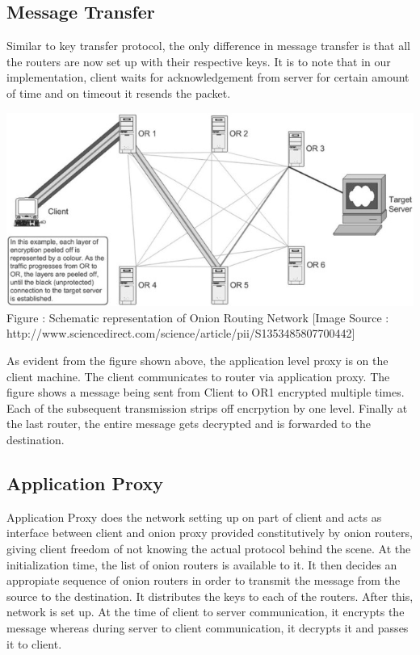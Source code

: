 \documentclass{article}
\begin{document}
\subsection*{Message Transfer}
Similar to key transfer protocol, the only difference in message transfer is that all the routers are now set up with their respective keys. It is to note that in our implementation, client waits for acknowledgement from server for certain amount of time and on timeout it resends the packet.
\newline
\newline
\begin{center}
\includegraphics{onion.jpg}
\newline
 \small{Figure : Schematic representation of Onion Routing Network}
 \newline
 \tiny{[Image Source : http://www.sciencedirect.com/science/article/pii/S1353485807700442]}
 \newline
\end{center}
As evident from the figure shown above, the application level proxy is on the client machine. The client communicates to router via application proxy. The figure shows a message being sent from Client to OR1 encrypted multiple times. Each of the subsequent transmission strips off encrpytion by one level. Finally at the last router, the entire message gets decrypted and is forwarded to the destination.
\subsection*{Application Proxy}
Application Proxy does the network setting up on part of client and acts as interface between client and onion proxy provided constitutively by onion routers, giving client freedom of not knowing the actual protocol behind the scene. At the initialization time, the list of onion routers is available to it. It then decides an appropiate sequence of onion routers in order to transmit the message from the source to the destination. It distributes the keys to each of the routers. After this, network is set up. At the time of client to server communication, it encrypts the message whereas during server to client communication, it decrypts it and passes it to client.
\end{document}
